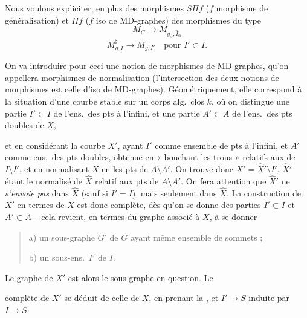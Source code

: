 \documentclass[11pt,a4paper]{article}
\begin{document}
Nous voulons expliciter, en plus des morphismes  $S\Pi f$ ($f$ morphisme de généralisation) et $\Pi f$ ($f$ iso de MD-graphes)  des morphismes du type
\[
M_{G} \longrightarrow M_{g_{\alpha},\hat{I}_{\alpha}}
\]
\[
M^{\natural}_{g,I} \longrightarrow M_{g,I'} \quad \text{pour } I' \subset I .
\]

On va introduire pour ceci une notion de morphismes de MD-graphes, qu'on appellera morphismes de normalisation (l'intersection des deux notions de morphismes est celle d'iso de MD-graphes). Géométriquement, elle correspond à la situation d'une courbe stable   sur un corps alg.\ clos $k$, où on distingue une partie $I' \subset I$ de l'ens.\ des pts à l'infini, et une partie $A' \subset A$ de l'ens.\ des pts doubles de $X$,

et en considérant la courbe $X'$, ayant $I'$ comme ensemble de pts à l'infini, et $A'$ comme ens.\ des pts doubles, obtenue en « bouchant les trous » relatifs aux  de $I \setminus I'$, \struck{\ill{}} et en normalisant $X$ en les pts de $A \setminus A'$. On trouve donc $X' = \hat{X}' \setminus I'$, $\hat{X}'$ étant le normalisé de $\hat{X}$ relatif aux pts de $A \setminus A'$. On fera attention que $\hat{X}'$ ne \emph{s'envoie pas} dans $\hat{X}$ (sauf si $I' = I$), mais seulement dans $\hat{X}$.
 La construction de $X'$ en termes de $X$ est donc complète, dès qu'on se donne des parties $I' \subset I$ et $A' \subset A$ -- cela revient, en termes du \struck{\ill{}} graphe associé à $X$, à se donner
\begin{quote}
a) un sous-graphe $G'$ de $G$ ayant même ensemble de sommets ;

b) un sous-ens.\ $I'$ de $I$.
\end{quote}
 Le graphe de $X'$ est alors le sous-graphe en question. Le 

complète de $X'$ se déduit de celle de $X$, en prenant la  , et $I' \to S$ induite par $I \to S$.
\end{document}
